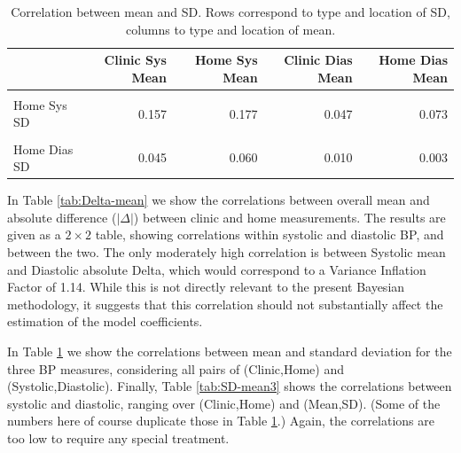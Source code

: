 \documentclass[
]{article}
\begin{document}
\begin{table}[!h]
\centering
\caption{\label{tab:SD-mean2}Correlation between mean and SD. Rows correspond to type and location of SD, columns to type and location of mean.}
\centering
\begin{tabular}[t]{lrrrr}
\toprule
  & Clinic Sys Mean & Home Sys Mean & Clinic Dias Mean & Home Dias Mean\\
\midrule
\cellcolor{gray!10}{Clinic Sys SD} & \cellcolor{gray!10}{0.269} & \cellcolor{gray!10}{0.254} & \cellcolor{gray!10}{0.095} & \cellcolor{gray!10}{0.106}\\
Home Sys SD & 0.157 & 0.177 & 0.047 & 0.073\\
\cellcolor{gray!10}{Clinic Dias SD} & \cellcolor{gray!10}{0.041} & \cellcolor{gray!10}{0.030} & \cellcolor{gray!10}{-0.076} & \cellcolor{gray!10}{-0.037}\\
Home Dias SD & 0.045 & 0.060 & 0.010 & 0.003\\
\bottomrule
\end{tabular}
\end{table}

In Table \ref{tab:Delta-mean} we show the correlations between overall mean and absolute difference (\(|\Delta|\)) between clinic and home measurements.
The results are given as a \(2\times2\) table, showing correlations within systolic and diastolic BP, and between the two.
The only moderately high correlation is between Systolic mean and Diastolic absolute Delta, which would correspond to a Variance Inflation Factor of 1.14.
While this is not directly relevant to the present Bayesian methodology, it suggests that this correlation should not substantially affect the estimation of the model coefficients.

In Table \ref{tab:SD-mean2} we show the correlations between mean and standard deviation for the three BP measures, considering all pairs of (Clinic,Home) and (Systolic,Diastolic).
Finally, Table \ref{tab:SD-mean3} shows the correlations between systolic and diastolic, ranging over (Clinic,Home) and (Mean,SD).
(Some of the numbers here of course duplicate those in Table \ref{tab:SD-mean2}.)
Again, the correlations are too low to require any special treatment.
\end{document}
